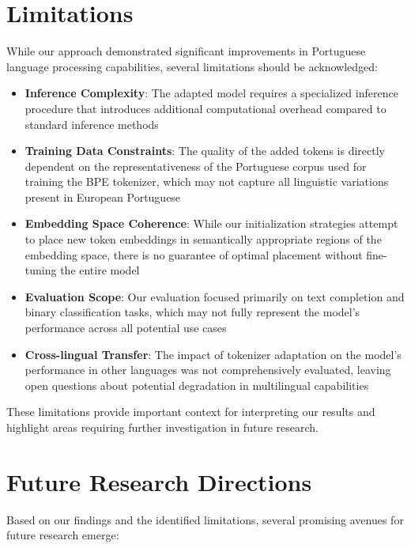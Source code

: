 \section{Limitations}
While our approach demonstrated significant improvements in Portuguese language processing capabilities, several limitations should be acknowledged:

\begin{itemize}
    \item \textbf{Inference Complexity}: The adapted model requires a specialized inference procedure that introduces additional computational overhead compared to standard inference methods
    
    \item \textbf{Training Data Constraints}: The quality of the added tokens is directly dependent on the representativeness of the Portuguese corpus used for training the BPE tokenizer, which may not capture all linguistic variations present in European Portuguese
    
    \item \textbf{Embedding Space Coherence}: While our initialization strategies attempt to place new token embeddings in semantically appropriate regions of the embedding space, there is no guarantee of optimal placement without fine-tuning the entire model
    
    \item \textbf{Evaluation Scope}: Our evaluation focused primarily on text completion and binary classification tasks, which may not fully represent the model's performance across all potential use cases
    
    \item \textbf{Cross-lingual Transfer}: The impact of tokenizer adaptation on the model's performance in other languages was not comprehensively evaluated, leaving open questions about potential degradation in multilingual capabilities
\end{itemize}

These limitations provide important context for interpreting our results and highlight areas requiring further investigation in future research.

\section{Future Research Directions}
Based on our findings and the identified limitations, several promising avenues for future research emerge:


